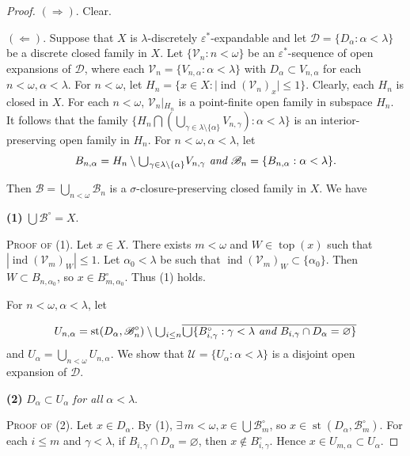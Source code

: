 \documentclass[main.tex]{subfiles}
\begin{document}
\begin{proof}
$(\Rightarrow)$. Clear.

$(\Leftarrow)$. 
Suppose that $X$ is $\lambda$-discretely $\varepsilon^*$-expandable and 
let $\mathscr{D} = \{D_\alpha: \alpha < \lambda\}$ be a 
discrete closed family in $X$. Let $\{\mathscr{V}_n: n < \omega\}$ be an
$\varepsilon^*$-sequence of open expansions of $\mathscr{D}$, where each $\mathscr{V}_n = \{V_{n,\alpha}: \alpha < \lambda\}$ with 
$D_\alpha \subset V_{n,\alpha}$ for each 
$n < \omega, \alpha < \lambda$. For $n <\omega$, let 
$H_n = \{x \in X: \vert{}\operatorname{ind}(\mathscr{V}_n)_x\vert{} \le 1\}$. 
Clearly, each $H_n$ is closed in $X$. 
For each $n < \omega$, $\mathscr{V}_n\vert{}_{H_n}$ 
is a point-finite open family in subspace $H_n$. 
It follows that the family 
$\{H_n \bigcap(\bigcup_{\gamma \in \lambda\setminus\{\alpha\}}V_{n,\gamma}): \alpha < \lambda\}$ 
is an interior-preserving open family in $H_n$. 
For $n < \omega, \alpha < \lambda$, let
$$B_{n,\alpha} = H_n \setminus \raisebox{-2pt}{\scalebox{1.5}{$\cup$}}_{
	\gamma\in \lambda\setminus\{\alpha\}} V_{n,\gamma} 
\textit{ and } \mathscr{B}_n = \{B_{n,\alpha}: \alpha < \lambda\}.$$

\noindent Then $\mathscr{B} = \bigcup_{n < \omega} \mathscr{B}_n$ is 
a $\sigma$-closure-preserving closed family in $X$. We have

\textbf{(1)}  $\bigcup \mathscr{B}^\circ = X$.

\noindent\textsc{Proof of (1)}. Let $x \in X$. There exists $m < \omega$ and 
$W \in \operatorname{top}(x)$ such that 
$|\operatorname{ind}(\mathscr{V}_m)_W|\le 1$. 
Let $\alpha_0<\lambda$ be such that 
$\operatorname{ind}(\mathscr{V}_m)_W\subset \{\alpha_0\}$. 
Then $W\subset B_{n,\alpha_0} $, so $x\in B_{m, \alpha_0}^\circ$. Thus (1) holds.

For $n < \omega, \alpha<\lambda$, let

$$U_{n,\alpha} = \operatorname{st}(D_\alpha, \mathscr{B}_n^\circ)
\setminus \raisebox{-2pt}{\scalebox{1.5}{$\cup$}}_{i \le n} 
\overline{\raisebox{-2pt}{\scalebox{1.5}{$\cup$}} \{B_{i,\gamma}^\circ: \gamma < \lambda
	\textit{ and }B_{i,\gamma} \cap D_\alpha = \varnothing\}}$$
and $U_\alpha = \bigcup_{n < \omega} U_{n,\alpha}$. We show that 
$\mathscr{U} = \{U_\alpha: \alpha < \lambda\}$ 
is a disjoint open expansion of $\mathscr{D}$.

\textbf{(2)} $D_\alpha \subset U_\alpha$ \textit{ for all } $\alpha < \lambda$.

\noindent\textsc{Proof of (2)}. Let $x \in D_\alpha$. 
By (1), $\exists \, m < \omega, x \in \bigcup \mathscr{B}_m^\circ$, 
so $x\in \operatorname{st}(D_\alpha, \mathscr{B}_m^\circ)$.
For each $i \le m$ and $\gamma < \lambda$, 
if $B_{i,\gamma} \cap D_\alpha = \varnothing$, then 
$x \notin B_{i,\gamma}^\circ$. Hence $x \in U_{m,\alpha} \subset U_\alpha$.


\end{proof}
\end{document}
